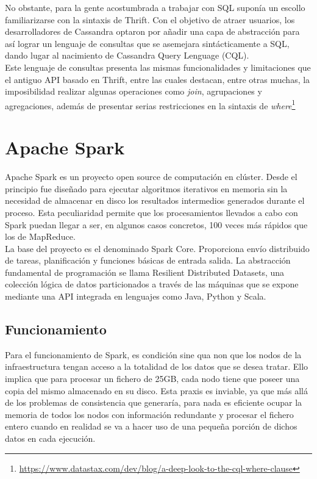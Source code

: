 No obstante, para la gente acostumbrada a trabajar con SQL suponía un escollo familiarizarse con la sintaxis de Thrift. Con el objetivo de atraer usuarios, los desarrolladores de Cassandra optaron por añadir una capa de abstracción para así lograr un lenguaje de consultas que se asemejara sintácticamente a SQL, dando lugar al nacimiento de Cassandra Query Lenguage (CQL).\\

Este lenguaje de consultas presenta las mismas funcionalidades y limitaciones que el antiguo API basado en Thrift, entre las cuales destacan, entre otras muchas, la imposibilidad realizar algunas operaciones como \textit{join}, agrupaciones y agregaciones, además de presentar serias restricciones en la sintaxis de \textit{where}\footnote{\url{https://www.datastax.com/dev/blog/a-deep-look-to-the-cql-where-clause}}

\section{Apache Spark}

Apache Spark\cite{zaharia2010spark} es un proyecto open source de computación en clúster. Desde el principio fue diseñado para ejecutar algoritmos iterativos en memoria sin la necesidad de almacenar en disco los resultados intermedios generados durante el proceso. Esta peculiaridad permite que los procesamientos llevados a cabo con Spark puedan llegar a ser, en algunos casos concretos, 100 veces más rápidos que los de MapReduce\cite{dean2008mapreduce}.\\

La base del proyecto es el denominado Spark Core. Proporciona envío distribuido de tareas, planificación y funciones básicas de entrada salida. La abstracción fundamental de programación se llama Resilient Distributed Datasets\cite{zaharia2012resilient}, una colección lógica de datos particionados a través de las máquinas que se expone mediante una API integrada en lenguajes como Java, Python y Scala.

\subsection{Funcionamiento}

Para el funcionamiento de Spark, es condición sine qua non que los nodos de la infraestructura tengan acceso a la totalidad de los datos que se desea tratar. Ello implica que para procesar un fichero de 25GB, cada nodo tiene que poseer una copia del mismo almacenado en su disco. Esta praxis es inviable, ya que más allá de los problemas de consistencia que generaría, para nada es eficiente ocupar la memoria de todos los nodos con información redundante y procesar el fichero entero cuando en realidad se va a hacer uso de una pequeña porción de dichos datos en cada ejecución.\\

